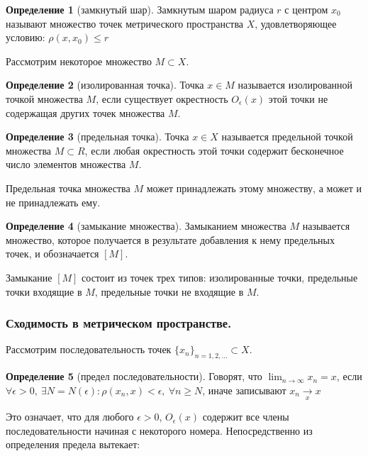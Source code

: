 \documentclass[14pt,a4paper]{extarticle}
\theoremstyle{definition}
\newtheorem{definition}{Определение}[section]
\theoremstyle{remark}
\renewcommand{\[}{\begin{dmath*}[compact]}
\renewcommand{\]}{\end{dmath*}}
\newcommand{\ds}{\displaystyle}
\newcommand{\sep}{ , \ \allowbreak }
\begin{document}
\begin{definition}[замкнутый шар]
  Замкнутым шаром радиуса $r$ с центром $x_0$ называют множество точек
  метрического пространства $X$,
  удовлетворяющее условию: $\rho(x, x_0) \leq r$
\end{definition}

Рассмотрим некоторое множество $M \subset X$.

\begin{definition}[изолированная точка]
  Точка $x \in M$ называется изолированной точкой множества $M$,
  если существует окрестность $O_\epsilon(x)$
  этой точки не содержащая других точек множества $M$.
\end{definition}

\begin{definition}[предельная точка]
  Точка $x \in X$ называется предельной точкой множества $M \subset R$,
  если любая окрестность этой точки содержит бесконечное число
  элементов множества $M$.
\end{definition}

Предельная точка множества $M$ может принадлежать этому множеству, а может
и не принадлежать ему.

\begin{definition}[замыкание множества]
  Замыканием множества $M$ называется множество,
  которое получается в результате добавления к нему предельных точек,
  и обозначается $[M]$.
\end{definition}

Замыкание $[M]$ состоит из точек трех типов: изолированные точки, предельные
точки входящие в $M$, предельные точки не входящие в $M$.

\subsubsection{Сходимость в метрическом пространстве.}

Рассмотрим последовательность точек $\{x_n\}_{n=1,2,\dots}\subset X$.

\begin{definition}[предел последовательности]
  Говорят, что $\ds\lim_{n \to \infty} x_n = x$, если
  $\forall \epsilon > 0 \sep \exists N = N(\epsilon): \rho(x_n, x)<\epsilon \sep
  \forall n \geq N$, иначе записывают $x_n \underset{x}{\to} x$
\end{definition}

Это означает, что для любого $\epsilon > 0$, $O_\epsilon(x)$ содержит все
члены последовательности начиная с некоторого номера. Непосредственно из
определения предела вытекает:
\end{document}
